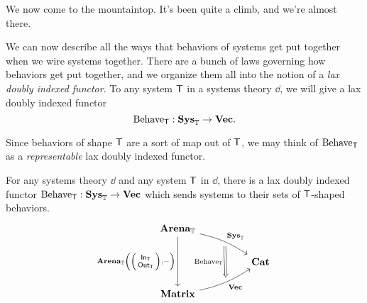 \documentclass[DynamicalBook]{subfiles}
\begin{document}
We now come to the mountaintop. It's been quite a climb, and we're almost there.

We can now describe all the ways that behaviors of systems get put together when
we wire systems together. There are a bunch of laws governing how behaviors get
put together, and we organize them all into the notion of a \emph{lax doubly
  indexed functor}. To any system $\mathsf{T}$ in a systems theory $\dd$, we will give a lax doubly indexed
functor
$$\mathrm{Behave}_{\mathsf{T}} : \textbf{Sys}_{\mathbb{T}} \to \textbf{Vec}.$$

Since behaviors of shape $\mathsf{T}$ are a sort of map out of $\mathsf{T}$, we may
think of $\mathrm{Behave}_{\mathsf{T}}$ as a \emph{representable} lax doubly indexed
functor. 


\begin{theorem}\label{thm.representable_discrete}
  For any systems theory $\dd$ and any system $\mathsf{T}$ in $\dd$, there is a lax doubly indexed functor
$\mathrm{Behave}_{\mathsf{T}} : \textbf{Sys}_{\mathbb{T}} \to \textbf{Vec}$
which sends systems to their sets of $\mathsf{T}$-shaped behaviors.
\[\begin{tikzcd}
	{\Cat{Arena}_{\dd}} \\
	&& {\Cat{Cat}} \\
	{\Cat{Matrix}}
	\arrow[""{name=0, anchor=center, inner sep=0}, "{\Cat{Sys}_{\dd}}", from=1-1,
  to=2-3, bend left = 10]
	\arrow[""{name=1, anchor=center, inner sep=0}, "{\Cat{Vec}}"', from=3-1,
  to=2-3, bend right = 10]
	\arrow["{\Cat{Arena}_{\dd}\left(\littlelens{\In{T}}{\Out{T}},-\right)}"', from=1-1, to=3-1]
	\arrow["{\Fun{Behave}_{\Sys{T}}}"', shorten <=4pt, shorten >=4pt, Rightarrow, from=0, to=1]
\end{tikzcd}\]
\end{theorem}
\end{document}
